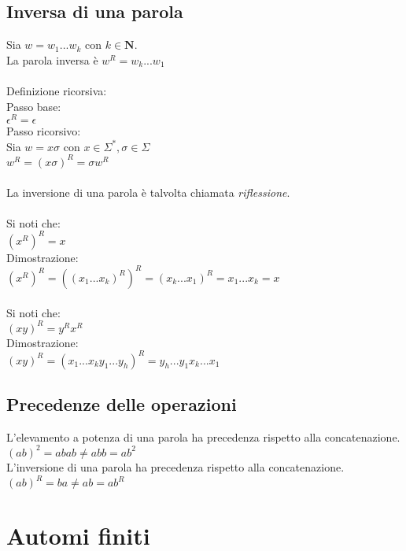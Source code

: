 \documentclass[]{article}
\begin{document}
\subsection{Inversa di una parola}

Sia \mbox{$w = w_1...w_k$} con \mbox{$k \in \mathbf{N}$}.
\\
La parola inversa è \mbox{$w^R = w_k...w_1$}
\\
\\
Definizione ricorsiva:
\\
Passo base:
\\
\mbox{$\epsilon^R = \epsilon$}
\\
Passo ricorsivo:
\\
Sia \mbox{$w = x \sigma$} con \mbox{$x \in \Sigma^*, \sigma \in \Sigma$}
\\
\mbox{$w^R = (x \sigma)^R = \sigma w^R$}
\\
\\
La inversione di una parola è talvolta chiamata \textit{riflessione}.
\\
\\
Si noti che:
\\
\mbox{$ (x^R)^R = x $}
\\
Dimostrazione:
\\
\mbox{$ (x^R)^R = ((x_1...x_k)^R)^R = (x_k...x_1)^R = x_1...x_k = x $}
\\
\\
Si noti che:
\\
\mbox{$ (xy)^R = y^R x^R $}
\\
Dimostrazione:
\\
\mbox{$ (xy)^R = (x_1...x_k y_1...y_h)^R = y_h...y_1 x_k...x_1 $}



\subsection{Precedenze delle operazioni}

L'elevamento a potenza di una parola ha precedenza rispetto alla concatenazione.
\\
\mbox{$ (ab)^2 = abab \neq abb = ab^2 $}
\\
L'inversione di una parola ha precedenza rispetto alla concatenazione.
\\
\mbox{$ (ab)^R = ba \neq ab = ab^R $}


\newpage
\section{Automi finiti}
\end{document}
